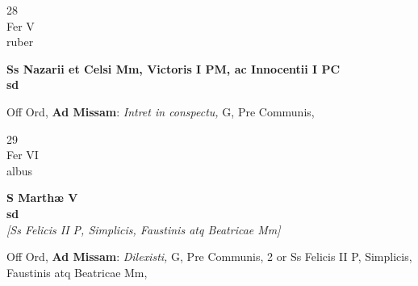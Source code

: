 \documentclass[10pt, openany]{book}
\begin{document}
        \begin{center}
            \begin{minipage}{3.5in}
                \vspace{2em}
                \begin{minipage}{0.5in}
                    {\Huge 28} \\
                    {\normalsize Fer V} \\
                    {\normalsize ruber}
                \end{minipage}
                \begin{minipage}{3.0in}
                    \textbf{ \large Ss Nazarii et Celsi Mm, Victoris I PM, ac Innocentii I PC \\
                    \textnormal{\normalsize sd}} \\ 
                \end{minipage}
                \begin{justify}Off Ord, \textbf{Ad Missam}: \textit{Intret in conspectu,} G, Pre Communis,   
                \end{justify}
            \end{minipage}
        \end{center}
    
        \begin{center}
            \begin{minipage}{3.5in}
                \vspace{2em}
                \begin{minipage}{0.5in}
                    {\Huge 29} \\
                    {\normalsize Fer VI} \\
                    {\normalsize albus}
                \end{minipage}
                \begin{minipage}{3.0in}
                    \textbf{ \large S Marthæ V \\
                    \textnormal{\normalsize sd}} \\ \textit{[Ss Felicis II P, Simplicis, Faustinis atq Beatricae Mm]} \\ 
                \end{minipage}
                \begin{justify}Off Ord, \textbf{Ad Missam}: \textit{Dilexisti,} G, Pre Communis, 2 or Ss Felicis II P, Simplicis, Faustinis atq Beatricae Mm,   
                \end{justify}
            \end{minipage}
        \end{center}
    
\end{document}
